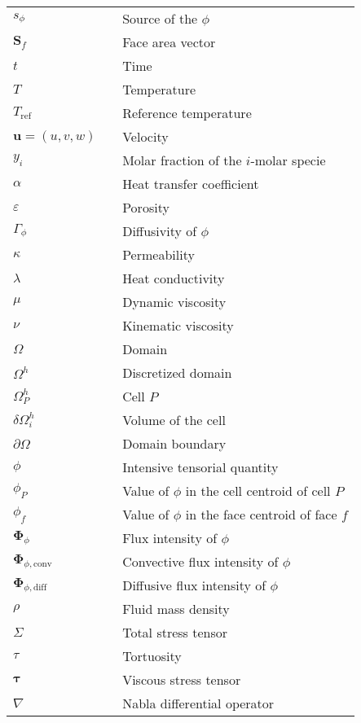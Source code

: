 \begin{longtable}{lp{}l}
    ${s}_{\phi}$ &\dotfill & Source of the $\phi$\\
    $\bm{S}_{f}$ & \dotfill & Face area vector\\
    $t$ &\dotfill & Time\\
    $T$ &\dotfill & Temperature\\
    ${T_{\mathrm{ref}}}$ &\dotfill & Reference temperature\\
    $\bm{u} = (u,v,w)$&\dotfill & Velocity\\
    $y_i$&\dotfill & Molar fraction of the $i$-molar specie\\
    $\alpha$  &\dotfill & Heat transfer coefficient\\
    $\varepsilon$  &\dotfill & Porosity\\
    $\Gamma_\phi$  &\dotfill & Diffusivity of $\phi$\\
    $\kappa$  &\dotfill & Permeability\\
    $\lambda$  &\dotfill & Heat conductivity\\
    $\mu$ &\dotfill & Dynamic viscosity\\
    $\nu$ &\dotfill & Kinematic viscosity\\
    $\Omega$ &\dotfill & Domain\\
    $\Omega^h$ & \dotfill & Discretized domain\\
    $\Omega^h_P$ & \dotfill & Cell $P$\\
    $\delta\Omega^h_i$ & \dotfill & Volume of the cell\\
    $\partial\Omega$ &\dotfill & Domain boundary\\
    $\phi$ &\dotfill & Intensive tensorial quantity\\
    $\phi_P$ &\dotfill & Value of $\phi$ in the cell centroid of cell $P$\\
    $\phi_f$ &\dotfill & Value of $\phi$ in the face centroid of face $f$\\
    $\bm{\Phi}_{\phi}$&\dotfill & Flux intensity of $\phi$\\
    $\bm{\Phi}_{\phi,\mathrm{conv}}$&\dotfill & Convective flux intensity of $\phi$\\
    $\bm{\Phi}_{\phi,\mathrm{diff}}$&\dotfill & Diffusive flux intensity of $\phi$\\
    $\rho$ &\dotfill & Fluid mass density\\
    $\Sigma$ &\dotfill & Total stress tensor\\
    $\tau$  &\dotfill & Tortuosity\\
    $\bm{\tau}$ &\dotfill & Viscous stress tensor\\
    $\nabla$&\dotfill & Nabla differential operator\\

\end{longtable}    


